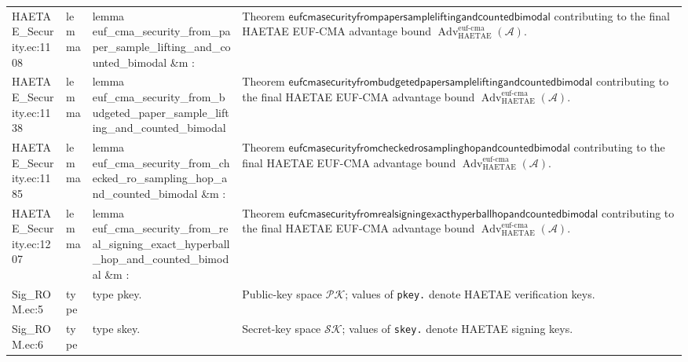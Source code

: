 \documentclass[10pt]{article}
\newcommand{\EC}[1]{\texttt{#1}}
\newcommand{\Adv}{\operatorname{Adv}}
\begin{document}
\begin{longtable}{L{0.11\textwidth}L{0.055\textwidth}L{0.385\textwidth}L{0.41\textwidth}}
HAETAE\_\allowbreak{}Security.\allowbreak{}ec:\allowbreak{}1108 & lemma & {\ttfamily\scriptsize lemma euf\_\allowbreak{}cma\_\allowbreak{}security\_\allowbreak{}from\_\allowbreak{}paper\_\allowbreak{}sample\_\allowbreak{}lifting\_\allowbreak{}and\_\allowbreak{}counted\_\allowbreak{}bimodal \&m :} & Theorem $\mathsf{eufcmasecurityfrompapersampleliftingandcountedbimodal}$ contributing to the final HAETAE EUF-CMA advantage bound $\Adv_{\mathrm{HAETAE}}^{\mathrm{euf\mbox{-}cma}}(\mathcal A)$. \\
HAETAE\_\allowbreak{}Security.\allowbreak{}ec:\allowbreak{}1138 & lemma & {\ttfamily\scriptsize lemma euf\_\allowbreak{}cma\_\allowbreak{}security\_\allowbreak{}from\_\allowbreak{}budgeted\_\allowbreak{}paper\_\allowbreak{}sample\_\allowbreak{}lifting\_\allowbreak{}and\_\allowbreak{}counted\_\allowbreak{}bimodal} & Theorem $\mathsf{eufcmasecurityfrombudgetedpapersampleliftingandcountedbimodal}$ contributing to the final HAETAE EUF-CMA advantage bound $\Adv_{\mathrm{HAETAE}}^{\mathrm{euf\mbox{-}cma}}(\mathcal A)$. \\
HAETAE\_\allowbreak{}Security.\allowbreak{}ec:\allowbreak{}1185 & lemma & {\ttfamily\scriptsize lemma euf\_\allowbreak{}cma\_\allowbreak{}security\_\allowbreak{}from\_\allowbreak{}checked\_\allowbreak{}ro\_\allowbreak{}sampling\_\allowbreak{}hop\_\allowbreak{}and\_\allowbreak{}counted\_\allowbreak{}bimodal \&m :} & Theorem $\mathsf{eufcmasecurityfromcheckedrosamplinghopandcountedbimodal}$ contributing to the final HAETAE EUF-CMA advantage bound $\Adv_{\mathrm{HAETAE}}^{\mathrm{euf\mbox{-}cma}}(\mathcal A)$. \\
HAETAE\_\allowbreak{}Security.\allowbreak{}ec:\allowbreak{}1207 & lemma & {\ttfamily\scriptsize lemma euf\_\allowbreak{}cma\_\allowbreak{}security\_\allowbreak{}from\_\allowbreak{}real\_\allowbreak{}signing\_\allowbreak{}exact\_\allowbreak{}hyperball\_\allowbreak{}hop\_\allowbreak{}and\_\allowbreak{}counted\_\allowbreak{}bimodal \&m :} & Theorem $\mathsf{eufcmasecurityfromrealsigningexacthyperballhopandcountedbimodal}$ contributing to the final HAETAE EUF-CMA advantage bound $\Adv_{\mathrm{HAETAE}}^{\mathrm{euf\mbox{-}cma}}(\mathcal A)$. \\
Sig\_\allowbreak{}ROM.\allowbreak{}ec:\allowbreak{}5 & type & {\ttfamily\scriptsize type pkey.} & Public-key space $\mathcal{PK}$; values of \EC{pkey.} denote HAETAE verification keys. \\
Sig\_\allowbreak{}ROM.\allowbreak{}ec:\allowbreak{}6 & type & {\ttfamily\scriptsize type skey.} & Secret-key space $\mathcal{SK}$; values of \EC{skey.} denote HAETAE signing keys. \\

\end{longtable}
\end{document}
